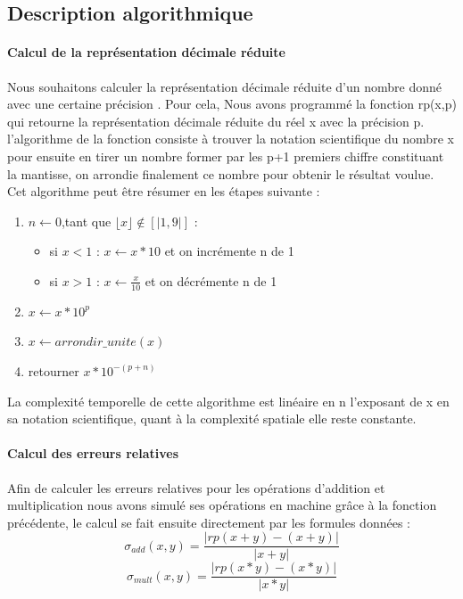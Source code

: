 \documentclass{article}
\begin{document}
\subsection{Description algorithmique}
\paragraph{Calcul de la représentation décimale réduite\\} 
Nous souhaitons calculer la représentation décimale réduite d'un nombre donné avec une certaine précision . Pour cela, Nous avons programmé la fonction rp(x,p) qui retourne la représentation décimale réduite du réel x avec la précision p. l'algorithme de la fonction consiste à trouver la notation scientifique du nombre x pour ensuite en tirer un nombre former par les p+1 premiers chiffre constituant la mantisse, on arrondie finalement ce nombre pour obtenir le résultat voulue. Cet algorithme peut \^etre résumer en les étapes suivante :
\begin{enumerate}
    \item $ n \leftarrow 0$,tant que $ \lfloor x \rfloor \notin [|1 , 9|] $ :
     \begin{itemize}
         \item si $ x < 1$ : $ x \leftarrow x*10$ et on incrémente n de 1
         \item si  $x>1$ : $x \leftarrow \frac{x}{10}$ et on décrémente n de 1
     \end{itemize}
     \item $x \leftarrow x*10^{p}$
     \item $ x \leftarrow arrondir\_unite(x)$
     \item  retourner $x*10^{-(p+n)}$
\end{enumerate}

La complexité temporelle de cette algorithme est linéaire en n l'exposant de x en sa notation scientifique, quant à la complexité spatiale elle reste constante.
\paragraph{Calcul des erreurs relatives\\}
Afin de calculer les erreurs relatives pour les opérations d'addition et multiplication nous avons simulé ses opérations en machine grâce à la fonction précédente, le calcul se fait ensuite directement par les formules données :
\begin{equation}
    \sigma_{add} (x,y) = \frac{|rp(x+y) - (x+y)|}{|x+y|}   
\end{equation}
\begin{equation}
    \sigma_{mult} (x,y) = \frac{|rp(x*y) - (x*y)|}{|x*y|}
\end{equation}
\end{document}
